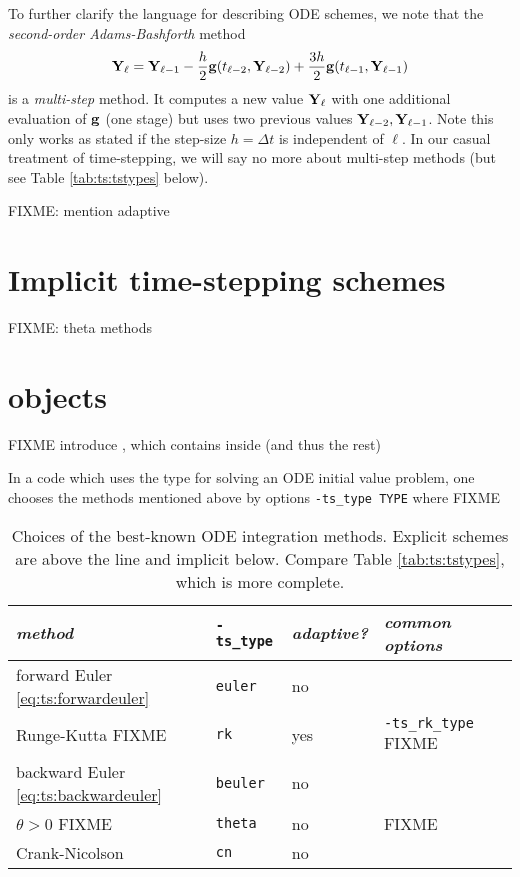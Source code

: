 To further clarify the language for describing ODE schemes, we note that the \emph{second-order Adams-Bashforth} method
\begin{equation}
\mathbf{Y}_\ell = \mathbf{Y}_{\ell-1} - \frac{h}{2} \mathbf{g}(t_{\ell-2},\mathbf{Y}_{\ell-2}) + \frac{3 h}{2} \mathbf{g}(t_{\ell-1},\mathbf{Y}_{\ell-1})  \label{eq:ts:ab2}
\end{equation}
is a \emph{multi-step} method.  It computes a new value $\mathbf{Y}_\ell$ with one additional evaluation of $\mathbf{g}$ (one stage) but uses two previous values $\mathbf{Y}_{\ell-2},\mathbf{Y}_{\ell-1}$.  Note this only works as stated if the step-size $h=\Delta t$ is independent of $\ell$.  In our casual treatment of time-stepping, we will say no more about multi-step methods (but see Table \ref{tab:ts:tstypes} below).

FIXME: mention adaptive

\section{Implicit time-stepping schemes}

FIXME: theta methods




\section{\PETSc \pTS objects}

FIXME introduce \pTS, which contains \pSNES inside (and thus the rest)

In a \PETSc code which uses the \pTS type for solving an ODE initial value problem, one chooses the methods mentioned above by options \texttt{-ts\_type TYPE} where FIXME

\begin{table}
\small
\begin{tabular}{lllll}
\emph{method}                                & \texttt{-ts\_type} & \emph{adaptive?} & \emph{common options} \\ \hline
forward Euler \eqref{eq:ts:forwardeuler}    & \texttt{euler}  & no & \\
Runge-Kutta  FIXME                          & \texttt{rk}     & yes & \texttt{-ts\_rk\_type} FIXME \\ \hline
backward Euler \eqref{eq:ts:backwardeuler}  & \texttt{beuler} & no & \\
$\theta>0$   FIXME                          & \texttt{theta}  & no & FIXME \\
Crank-Nicolson                              & \texttt{cn}     & no & 
\end{tabular}
\caption{Choices of the best-known ODE integration methods.  Explicit schemes are above the line and implicit below.  Compare Table \ref{tab:ts:tstypes}, which is more complete.} \label{tab:ts:odebasictypes}
\end{table}


